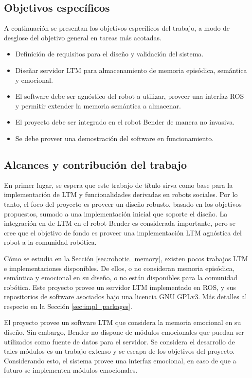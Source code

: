 \subsection{Objetivos específicos}

A continuación se presentan los objetivos específicos del trabajo, a modo de desglose del objetivo general en tareas más acotadas.
\begin{itemize}
	\item Definición de requisitos para el diseño y validación del sistema.
	\item Diseñar servidor LTM para almacenamiento de memoria episódica, semántica y emocional.
	\item El software debe ser agnóstico del robot a utilizar, proveer una interfaz ROS y permitir extender la memoria semántica a almacenar.
	\item El proyecto debe ser integrado en el robot Bender de manera no invasiva.
	\item Se debe proveer una demostración del software en funcionamiento.
\end{itemize}

\subsection{Alcances y contribución del trabajo}

En primer lugar, se espera que este trabajo de título sirva como base para la implementación de LTM y funcionalidades derivadas en robots sociales. Por lo tanto, el foco del proyecto es proveer un diseño robusto, basado en los objetivos propuestos, sumado a una implementación inicial que soporte el diseño. La integración en de LTM en el robot Bender es considerada importante, pero se cree que el objetivo de fondo es proveer una implementación LTM agnóstica del robot a la comunidad robótica.

Cómo se estudia en la Sección \ref{sec:robotic_memory}, existen pocos trabajos LTM e implementaciones disponibles. De ellos, o no consideran memoria episódica, semántica y emocional en su diseño, o no están disponibles para la comunidad robótica. Este proyecto provee un servidor LTM implementado en ROS, y sus repositorios de software asociados bajo una licencia GNU GPLv3. Más detalles al respecto en la Sección \ref{sec:impl_packages}.

El proyecto provee un software LTM que considera la memoria emocional en su diseño. Sin embargo, Bender no dispone de módulos emocionales que puedan ser utilizados como fuente de datos para el servidor. Se considera el desarrollo de tales módulos es un trabajo extenso y se escapa de los objetivos del proyecto. Considerando esto, el sistema provee una interfaz emocional, en caso de que a futuro se implementen módulos emocionales.

